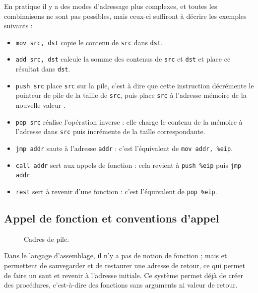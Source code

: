 En pratique il y a des modes d'adressage plus complexes, et toutes les
combinaisons ne sont pas possibles, mais ceux-ci suffiront à décrire les
exemples suivants :

\begin{itemize}

\item \texttt{mov src, dst} copie le contenu de \texttt{src} dans \texttt{dst}.

\item \texttt{add src, dst} calcule la somme des contenus de \texttt{src} et
  \texttt{dst} et place ce résultat dans \texttt{dst}.

\item \texttt{push src} place \texttt{src} sur la pile, c'est à dire que cette
  instruction décrémente le pointeur de pile \esp de la taille de \texttt{src},
  puis place \texttt{src} à l'adresse mémoire de la nouvelle valeur \esp.

\item \texttt{pop src} réalise l'opération inverse : elle charge le contenu de
  la mémoire à l'adresse \esp dans \texttt{src} puis incrémente \esp de la
  taille correspondante.

\item \texttt{jmp addr} saute à l'adresse \texttt{addr} : c'est l'équivalent de
  \texttt{mov addr, \%eip}.

\item \texttt{call addr} sert aux appels de fonction : cela revient à
  \texttt{push \%eip} puis \texttt{jmp addr}.

\item \texttt{rest} sert à revenir d'une fonction : c'est l'équivalent de
  \texttt{pop \%eip}.

\end{itemize}

\subsection{Appel de fonction et conventions d'appel}

\begin{figure} %

\caption[Cadres de pile]{ Cadres de pile. }
\label{fig:stackframe}
\end{figure} %

Dans le langage d'assemblage, il n'y a pas de notion de fonction ; mais
 et  permettent de sauvegarder et de restaurer une
adresse de retour, ce qui permet de faire un saut et revenir à l'adresse initiale.
Ce système permet déjà de créer des procédures, c'est-à-dire des fonctions sans
arguments ni valeur de retour.

